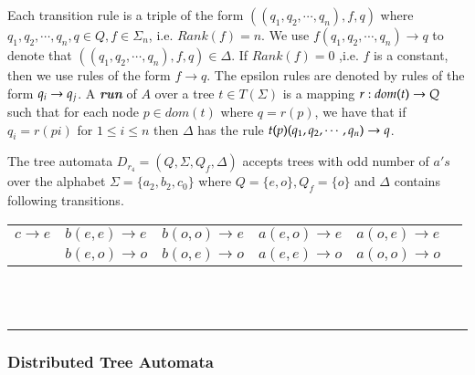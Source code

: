  Each transition rule is a triple of the form $((q_1,q_2,\cdots,q_n),f,q)$ where $q_1,q_2,\cdots,q_n,q \in Q, f \in \Sigma_n$,
  i.e. $Rank(f) = n$. We use $f(q_1,q_2,\cdots,q_n) \rightarrow q $ to denote that $((q_1,q_2,\cdots,q_n),f,q) \in \Delta$.
  If $Rank(f) = 0 $ ,i.e. $f$ is a constant, then we use rules of the form $f \rightarrow q$.
   The epsilon rules are denoted by rules of the form $q_i \rightarrow q_j $.
   A \textbf{\textsl{run}} of $A$ over a tree $t \in T(\Sigma) $ is a mapping 
   $r : dom(t) \rightarrow Q $ such that for each node $p \in dom(t) $ where $q = r(p)$,
   we have that if $q_i = r(pi) $ for $ 1 \le i \le n $ then $\Delta $ has the 
   rule $t(p)(q_1,q_2,\cdots,q_n) \rightarrow q$. 
\begin{example}
The tree automata $D_{r_{4}}=(Q,\Sigma ,Q_f, \Delta)$ accepts trees with odd number of $a's$  over the alphabet 
$\Sigma =\{a_2,b_2,c_0\}$ 
where $Q=\{e,o\},Q_f=\{o\}$ and $\Delta$ contains following transitions.\\

\begin{tabular}{llllll}
$c\rightarrow e$ & $ b(e,e) \rightarrow e$ & $ b(o,o) \rightarrow e$ & $a(e,o) \rightarrow e$ & 
$a(o,e) \rightarrow e$\\
&$b(e,o) \rightarrow o$ & $ b(o,e) \rightarrow o$ & $ a(e,e) \rightarrow o$ & $a(o,o) \rightarrow o$\\ 
\end{tabular}\\\\
\noindent \rule{\textwidth}{1pt}
\end{example}


\subsubsection{Distributed Tree Automata}

